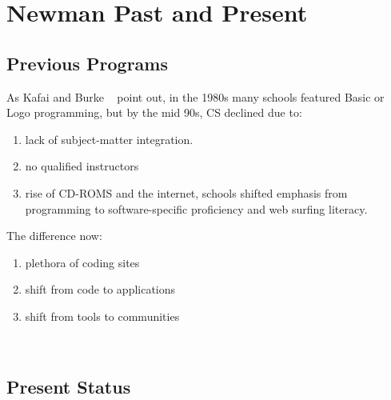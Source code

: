
\chapter{Newman Past and Present} %

\label{Chapter2} %



\section{Previous Programs}
As Kafai and Burke ~\cite{backtoschool} point out, in the 1980s many schools featured Basic or Logo programming, but by the mid 90s, CS declined due to:
\begin{enumerate}
	\item lack of subject-matter integration.
	\item no qualified instructors
	\item rise of CD-ROMS and the internet, schools shifted emphasis from programming to software-specific proficiency and web surfing literacy. 
\end{enumerate}
The difference now:
\begin{enumerate}
	\item plethora of coding sites
	\item shift from code to applications
	\item shift from tools to communities 
\end{enumerate}	
~\cite{backtoschool}

\section{Present Status}




